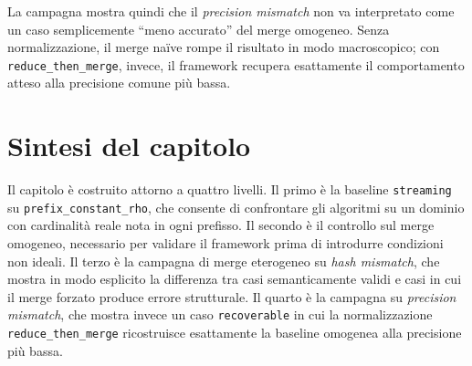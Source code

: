 La campagna mostra quindi che il \emph{precision mismatch} non va interpretato
come un caso semplicemente ``meno accurato'' del merge omogeneo. Senza
normalizzazione, il merge naïve rompe il risultato in modo macroscopico; con
\texttt{reduce\_then\_merge}, invece, il framework recupera esattamente il
comportamento atteso alla precisione comune più bassa.

\section{Sintesi del capitolo}

Il capitolo è costruito attorno a quattro livelli. Il primo è la baseline
\texttt{streaming} su \texttt{prefix\_constant\_rho}, che consente di
confrontare gli algoritmi su un dominio con cardinalità reale nota in ogni
prefisso. Il secondo è il controllo sul merge omogeneo, necessario per validare
il framework prima di introdurre condizioni non ideali. Il terzo è la campagna
di merge eterogeneo su \emph{hash mismatch}, che mostra in modo esplicito la
differenza tra casi semanticamente validi e casi in cui il merge forzato
produce errore strutturale. Il quarto è la campagna su
\emph{precision mismatch}, che mostra invece un caso \texttt{recoverable} in
cui la normalizzazione \texttt{reduce\_then\_merge} ricostruisce esattamente la
baseline omogenea alla precisione più bassa.
